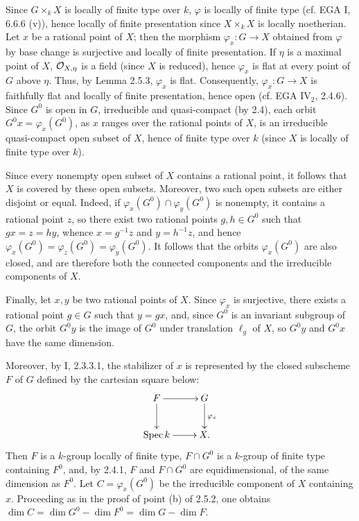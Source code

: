 Since $G\times_kX$ is locally of finite type over $k$, $\varphi$ is locally of finite type (cf. EGA I, 6.6.6 (v)), hence locally of finite presentation since $X\times_kX$ is locally noetherian. Let $x$ be a rational point of $X$; then the morphism $\varphi_x:G\to X$ obtained from $\varphi$ by base change is surjective and locally of finite presentation. If $\eta$ is a maximal point of $X$, $\mathcal{O}_{X,\eta}$ is a field (since $X$ is reduced), hence $\varphi_x$ is flat at every point of $G$ above $\eta$. Thus, by Lemma 2.5.3, $\varphi_x$ is flat. Consequently, $\varphi_x:G\to X$ is faithfully flat and locally of finite presentation, hence open (cf. EGA IV$_2$, 2.4.6). Since $G^0$ is open in $G$, irreducible and quasi-compact (by 2.4), each orbit $G^0x=\varphi_x(G^0)$, as $x$ ranges over the rational points of $X$, is an irreducible quasi-compact open subset of $X$, hence of finite type over $k$ (since $X$ is locally of finite type over $k$).

Since every nonempty open subset of $X$ contains a rational point, it follows that $X$ is covered by these open subsets. Moreover, two such open subsets are either disjoint or equal. Indeed, if $\varphi_x(G^0)\cap\varphi_y(G^0)$ is nonempty, it contains a rational point $z$, so there exist two rational points $g,h\in G^0$ such that $gx=z=hy$, whence $x=g^{-1}z$ and $y=h^{-1}z$, and hence $\varphi_x(G^0)=\varphi_z(G^0)=\varphi_y(G^0)$. It follows that the orbits $\varphi_x(G^0)$ are also closed, and are therefore both the connected components and the irreducible components of $X$.

Finally, let $x,y$ be two rational points of $X$. Since $\varphi_x$ is surjective, there exists a rational point $g\in G$ such that $y=gx$, and, since $G^0$ is an invariant subgroup of $G$, the orbit $G^0y$ is the image of $G^0$ under translation $\ell_g$ of $X$, so $G^0y$ and $G^0x$ have the same dimension.

Moreover, by I, 2.3.3.1, the stabilizer of $x$ is represented by the closed subscheme $F$ of $G$ defined by the cartesian square below:
\[
\xymatrix{F\ar[r]\ar[d]&G\ar[d]^{\varphi_x}\\\Spec k\ar[r]&X.}
\]
Then $F$ is a $k$-group locally of finite type, $F\cap G^0$ is a $k$-group of finite type containing $F^0$, and, by 2.4.1, $F$ and $F\cap G^0$ are equidimensional, of the same dimension as $F^0$. Let $C=\varphi_x(G^0)$ be the irreducible component of $X$ containing $x$. Proceeding as in the proof of point (b) of 2.5.2, one obtains $\dim C=\dim G^0-\dim F^0=\dim G-\dim F$.

